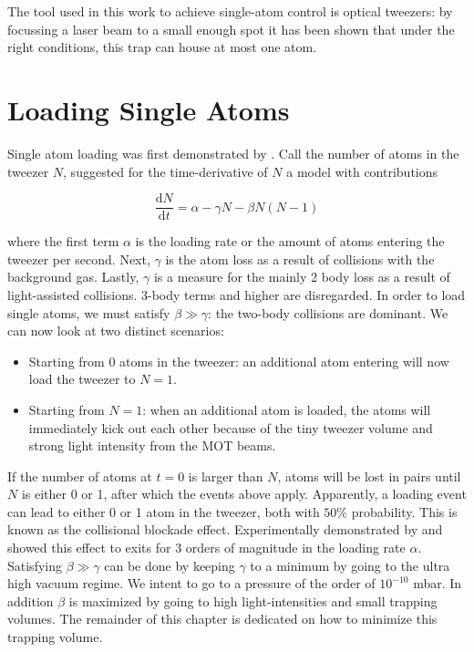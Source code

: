 The tool used in this work to achieve single-atom control is optical tweezers: by focussing a laser beam to a small enough spot it has been shown that under the right conditions, this trap can house at most one atom. 

\section{Loading Single Atoms}\label{sec:LoadingAtoms}

Single atom loading was first demonstrated by \cite{Schlosser2001}. 
Call the number of atoms in the tweezer $N$, \cite{Schlosser2002} suggested for the time-derivative of $N$ a model with contributions

\begin{equation}\label{LoadingTweezer}
	\frac{\text{d}N}{\text{d}t} = \alpha - \gamma N - \beta N(N-1)
\end{equation}

where the first term $\alpha$ is the loading rate or the amount of atoms entering the tweezer per second. 
Next, $\gamma$ is the atom loss as a result of collisions with the background gas. 
Lastly, $\gamma$ is a measure for the mainly 2 body loss as a result of light-assisted collisions.
3-body terms and higher are disregarded. 
In order to load single atoms, we must satisfy $\beta \gg \gamma$: the two-body collisions are dominant.
We can now look at two distinct scenarios:

\begin{itemize}
	\item Starting from 0 atoms in the tweezer: an additional atom entering will now load the tweezer to $N=1$. 
	
	\item Starting from $N=1$: when an additional atom is loaded, the atoms will immediately kick out each other because of the tiny tweezer volume and strong light intensity from the MOT beams. 
\end{itemize}

If the number of atoms at $t=0$ is larger than $N$, atoms will be lost in pairs until $N$ is either 0 or 1, after which the events above apply. 
Apparently, a loading event can lead to either 0 or 1 atom in the tweezer, both with $50\%$ probability. 
This is known as the collisional blockade effect. Experimentally demonstrated by \cite{Schlosser2001} and \cite{Schlosser2002} showed this effect to exits for 3 orders of magnitude in the loading rate $\alpha$.
Satisfying $\beta \gg \gamma$ can be done by keeping $\gamma$ to a minimum by going to the ultra high vacuum regime.
We intent to go to a pressure of the order of $10^{-10}$ mbar. In addition $\beta$ is maximized by going to high light-intensities and small trapping volumes. 
The remainder of this chapter is dedicated on how to minimize this trapping volume.

